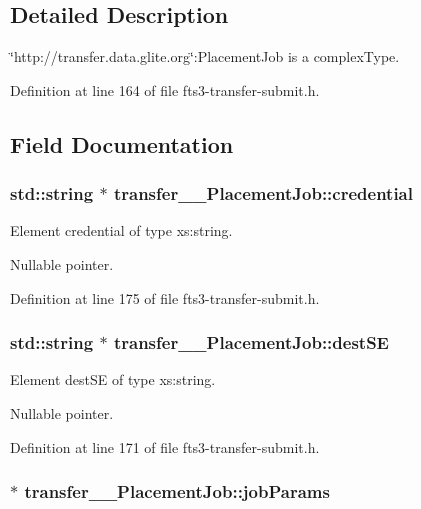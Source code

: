 \subsection{Detailed Description}
\char`\"{}http://transfer.data.glite.org\char`\"{}:PlacementJob is a complexType. 

Definition at line 164 of file fts3-\/transfer-\/submit.h.



\subsection{Field Documentation}
\subsubsection[{credential}]{\setlength{\rightskip}{0pt plus 5cm}std::string $\ast$ {\bf transfer\_\-\_\-PlacementJob::credential}}\label{classtransfer____PlacementJob_af222e324ccaea32471d6e69e90bb8858}


Element credential of type xs:string. 

Nullable pointer. 

Definition at line 175 of file fts3-\/transfer-\/submit.h.

\subsubsection[{destSE}]{\setlength{\rightskip}{0pt plus 5cm}std::string $\ast$ {\bf transfer\_\-\_\-PlacementJob::destSE}}\label{classtransfer____PlacementJob_aacb6f1571bc8045734ad8aa27c138c8a}


Element destSE of type xs:string. 

Nullable pointer. 

Definition at line 171 of file fts3-\/transfer-\/submit.h.

\subsubsection[{jobParams}]{ $\ast$ {\bf transfer\_\-\_\-PlacementJob::jobParams}}\label{classtransfer____PlacementJob_a83805591f9851821d2d4da834e0b1685}


